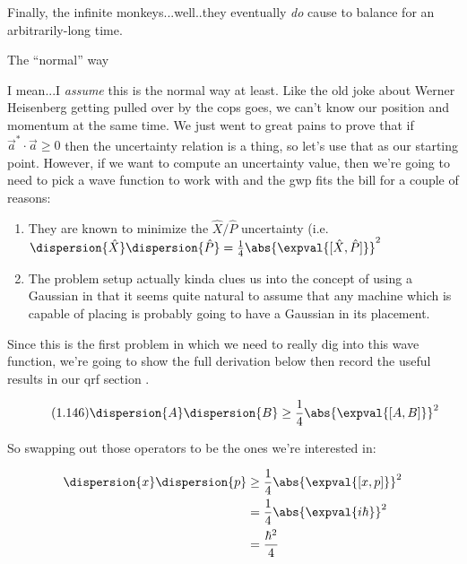 \begin{answer}
  Finally, the infinite monkeys...well..they eventually \emph{do}
  cause \icepick{} to balance for an arbitrarily-long time.


  \begin{answerpart}{The ``normal'' way}

    I mean...I \emph{assume} this is the normal way at least.  Like
    the old joke about Werner Heisenberg getting pulled over by the
    cops goes, we can't know our position and momentum at the same
    time.  We just went to great pains to prove that if $\vec{a}^{*}
    \cdot \vec{a} \ge 0$ then the uncertainty relation is a thing, so
    let's use that as our starting point.  However, if we want to
    compute an uncertainty value, then we're going to need to pick a
    wave function to work with and the \ac{gwp} fits the bill for a
    couple of reasons:

    \begin{enumerate}
    \item They are known to minimize the $\hat{X}/\hat{P}$ uncertainty
      (i.e. $\dispersion{\hat{X}}\dispersion{\hat{P}} = \frac{1}{4}
      \abs{\expval{[\hat{X}, \hat{P}]}}^2$

    \item The problem setup actually kinda clues us into the concept
      of using a Gaussian in that it seems quite natural to assume
      that any machine which is capable of placing \icepick{} is
      probably going to have a Gaussian in its placement.
    \end{enumerate}

    Since this is the first problem in which we need to really dig
    into this wave function, we're going to show the full derivation
    below then record the useful results in our \ac{qrf} section
    .
    
    \begin{equation}
      \tag{1.146}
      \dispersion{A}\dispersion{B} \ge \frac{1}{4} \abs{\expval{[A, B]}}^2
    \end{equation}

    So swapping out those operators to be the ones we're interested in:
  
    \begin{equation}
      \begin{split}
        \dispersion{x}\dispersion{p}
        &\ge \frac{1}{4} \abs{\expval{[x, p]}}^2\\
        &= \frac{1}{4} \abs{\expval{i\hbar}}^2\\
        &= \frac{\hbar^2}{4}\\
      \end{split}
    \end{equation}


\end{answerpart}
\end{answer}
